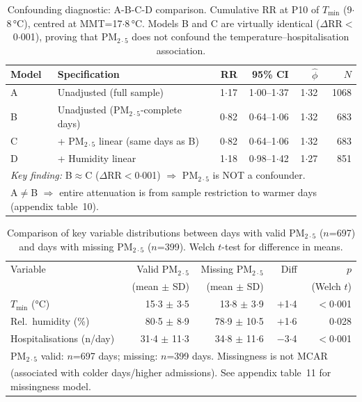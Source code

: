 \documentclass[12pt]{article}
\begin{document}
\begin{table}[ht]
\centering
\caption{Confounding diagnostic: A-B-C-D comparison. Cumulative RR at
P10 of $T_\mathrm{min}$ (9${\cdot}$8\,°C), centred at
MMT=17${\cdot}$8\,°C. Models B and C are virtually identical
($\Delta$RR$<$0${\cdot}$001), proving that $\text{PM}_{2{\cdot}5}$ does not
confound the temperature--hospitalisation association.}
\label{etab:adjusted_sensitivity}
\begin{tabular}{llrrrr}
\toprule
Model & Specification & RR & 95\% CI & $\hat{\phi}$ & $N$ \\
\midrule
A & Unadjusted (full sample)            & 1${\cdot}$17 & 1${\cdot}$00--1${\cdot}$37 & 1${\cdot}$32 & 1068 \\
B & Unadjusted ($\text{PM}_{2{\cdot}5}$-complete days) & 0${\cdot}$82 & 0${\cdot}$64--1${\cdot}$06 & 1${\cdot}$32 &  683 \\
C & + $\text{PM}_{2{\cdot}5}$ linear (same days as B)  & 0${\cdot}$82 & 0${\cdot}$64--1${\cdot}$06 & 1${\cdot}$32 &  683 \\
D & + Humidity linear                            & 1${\cdot}$18 & 0${\cdot}$98--1${\cdot}$42 & 1${\cdot}$27 &  851 \\
\bottomrule
\multicolumn{6}{l}{\footnotesize \textit{Key finding:} B$\approx$C ($\Delta$RR$<$0${\cdot}$001) $\Rightarrow$ $\text{PM}_{2{\cdot}5}$ is NOT a confounder.}\\
\multicolumn{6}{l}{\footnotesize A$\neq$B $\Rightarrow$ entire attenuation is from sample restriction to warmer days (appendix table~10).}
\end{tabular}
\end{table}

\begin{table}[ht]
\centering
\caption{Comparison of key variable distributions between days with
valid $\text{PM}_{2{\cdot}5}$ ($n$=697) and days with missing $\text{PM}_{2{\cdot}5}$
($n$=399). Welch $t$-test for difference in means.}
\label{etab:missing_data_comparison}
\begin{tabular}{lrrrr}
\toprule
Variable & Valid $\text{PM}_{2{\cdot}5}$ & Missing $\text{PM}_{2{\cdot}5}$ & Diff & $p$ \\
 & (mean $\pm$ SD) & (mean $\pm$ SD) & & (Welch $t$) \\
\midrule
$T_\mathrm{min}$ (°C)   & 15${\cdot}$3 $\pm$ 3${\cdot}$5 & 13${\cdot}$8 $\pm$ 3${\cdot}$9 & $+$1${\cdot}$4 & $<$0${\cdot}$001 \\
Rel.\ humidity (\%)       & 80${\cdot}$5 $\pm$ 8${\cdot}$9 & 78${\cdot}$9 $\pm$ 10${\cdot}$5 & $+$1${\cdot}$6 & 0${\cdot}$028 \\
Hospitalisations (n/day) & 31${\cdot}$4 $\pm$ 11${\cdot}$3 & 34${\cdot}$8 $\pm$ 11${\cdot}$6 & $-$3${\cdot}$4 & $<$0${\cdot}$001 \\
\bottomrule
\multicolumn{5}{l}{\footnotesize $\text{PM}_{2{\cdot}5}$ valid: $n$=697 days; missing: $n$=399 days. Missingness is not MCAR}\\
\multicolumn{5}{l}{\footnotesize (associated with colder days/higher admissions). See appendix table~11 for missingness model.}
\end{tabular}
\end{table}
\end{document}
